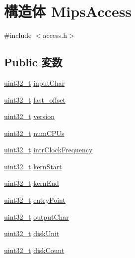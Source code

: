 \hypertarget{structMipsAccess}{
\section{構造体 MipsAccess}
\label{structMipsAccess}
}


{\ttfamily \#include $<$access.h$>$}\subsection*{Public 変数}
\begin{DoxyCompactItemize}
\item 
\hyperlink{Type_8hh_a435d1572bf3f880d55459d9805097f62}{uint32\_\-t} \hyperlink{structMipsAccess_a83c8ab78b181b01d72e89818bd5b5882}{inputChar}
\item 
\hyperlink{Type_8hh_a435d1572bf3f880d55459d9805097f62}{uint32\_\-t} \hyperlink{structMipsAccess_a589399e9f33ae0028f3868360bf5a665}{last\_\-offset}
\item 
\hyperlink{Type_8hh_a435d1572bf3f880d55459d9805097f62}{uint32\_\-t} \hyperlink{structMipsAccess_acd99bb05ca015e7d74448acb1deba7ca}{version}
\item 
\hyperlink{Type_8hh_a435d1572bf3f880d55459d9805097f62}{uint32\_\-t} \hyperlink{structMipsAccess_a62fe5772fdad74fda85b8510032153e0}{numCPUs}
\item 
\hyperlink{Type_8hh_a435d1572bf3f880d55459d9805097f62}{uint32\_\-t} \hyperlink{structMipsAccess_a67afaa4123cf0004c80816f4a4622b68}{intrClockFrequency}
\item 
\hyperlink{Type_8hh_a435d1572bf3f880d55459d9805097f62}{uint32\_\-t} \hyperlink{structMipsAccess_abb644efec07fab1ae32a4ede78ad6375}{kernStart}
\item 
\hyperlink{Type_8hh_a435d1572bf3f880d55459d9805097f62}{uint32\_\-t} \hyperlink{structMipsAccess_af38844b39dfe6f789ea85120ff54cb01}{kernEnd}
\item 
\hyperlink{Type_8hh_a435d1572bf3f880d55459d9805097f62}{uint32\_\-t} \hyperlink{structMipsAccess_a54acf23bba017f9573fea3a04094cc96}{entryPoint}
\item 
\hyperlink{Type_8hh_a435d1572bf3f880d55459d9805097f62}{uint32\_\-t} \hyperlink{structMipsAccess_a7bc0b92f0de9e6a4021ddbb2f34a5da1}{outputChar}
\item 
\hyperlink{Type_8hh_a435d1572bf3f880d55459d9805097f62}{uint32\_\-t} \hyperlink{structMipsAccess_a7cde789ad47d7de97911f8ddcde3aa4d}{diskUnit}
\item 
\hyperlink{Type_8hh_a435d1572bf3f880d55459d9805097f62}{uint32\_\-t} \hyperlink{structMipsAccess_af1b403484f3b5b91abc1ba4eebeecfd1}{diskCount}

\end{DoxyCompactItemize}
